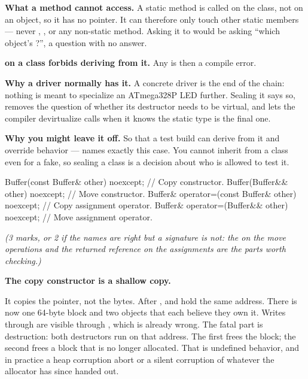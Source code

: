 \textbf{What a  method cannot access.} A static method is called on the class, not on
an object, so it has no  pointer. It can therefore only touch other static members ---
never , , or any non-static method. Asking it to would be asking ``which
object's ?'', a question with no answer. 

\textbf{ on a class forbids deriving from it.} Any  is then
a compile error. 

\textbf{Why a driver normally has it.} A concrete driver is the end of the chain: nothing is meant
to specialize an ATmega328P LED further. Sealing it says so, removes the question of whether its
destructor needs to be virtual, and lets the compiler devirtualize calls when it knows the static
type is the final one. 

\textbf{Why you might leave it off.} So that a test build can derive from it and override behavior
---  names exactly this case. You cannot inherit from a  class even for
a fake, so sealing a class is a decision about who is allowed to test it. 


\begin{cppcode}
Buffer(const Buffer& other) noexcept;             // Copy constructor.
Buffer(Buffer&& other) noexcept;                  // Move constructor.
Buffer& operator=(const Buffer& other) noexcept;  // Copy assignment operator.
Buffer& operator=(Buffer&& other) noexcept;       // Move assignment operator.
\end{cppcode}

\noindent\textit{(3 marks, or 2 if the names are right but a signature is not: the \code{&&} on the
move operations and the returned reference on the assignments are the parts worth checking.)}

\textbf{The copy constructor is a shallow copy.} 

It copies the pointer, not the bytes. After ,  and
 hold the same address. There is now one 64-byte block and two objects that each
believe they own it. Writes through  are visible through , which is already wrong.
The fatal part is destruction: both destructors run  on that address. The first frees
the block; the second frees a block that is no longer allocated. That is undefined behavior, and in
practice a heap corruption abort or a silent corruption of whatever the allocator has since handed
out.

